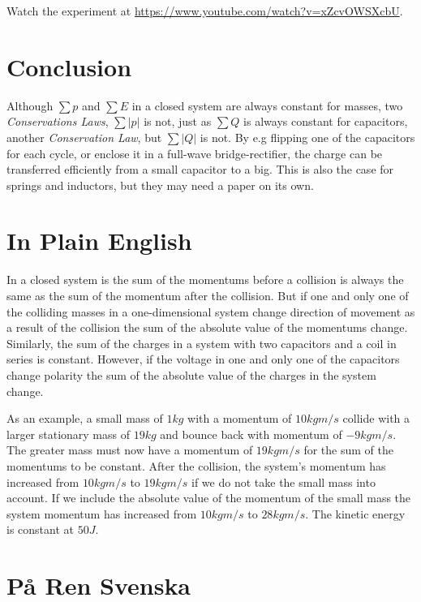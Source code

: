 \documentclass[]{elementary-physics}
\begin{document}
Watch the experiment at \url{https://www.youtube.com/watch?v=xZcvOWSXcbU}.

\section{Conclusion}

Although $\sum p$ and $\sum E$ in a closed system are always constant for masses, two \textit{Conservations Laws}, $\sum | p |$ is not, just as $\sum Q$ is always constant for capacitors, another \textit{Conservation Law}, but $\sum | Q |$ is not.
By e.g flipping one of the capacitors for each cycle, or enclose it in a full-wave bridge-rectifier, the charge can be transferred efficiently from a small capacitor to a big.
This is also the case for springs and inductors, but they may need a paper on its own.

\appendix

\section{In Plain English}

In a closed system is the sum of the momentums before a collision is always the same as the sum of the momentum after the collision.
But if one and only one of the colliding masses in a one-dimensional system change direction of movement as a result of the collision the sum of the absolute value of the momentums change.
Similarly, the sum of the charges in a system with two capacitors and a coil in series is constant.
However, if the voltage in one and only one of the capacitors change polarity the sum of the absolute value of the charges in the system change.

As an example, a small mass of $1 kg$ with a momentum of $10 kgm/s$ collide with a larger stationary mass of $19 kg$ and bounce back with momentum of $-9 kgm/s$.
The greater mass must now have a momentum of $19 kgm/s$ for the sum of the momentums to be constant.
After the collision, the system's momentum has increased from $10 kgm/s$ to $19 kgm/s$ if we do not take the small mass into account.
If we include the absolute value of the momentum of the small mass the system momentum has increased from $10 kgm/s$ to $28 kgm/s$.
The kinetic energy is constant at $50 J$.

\section{På Ren Svenska}
\end{document}
